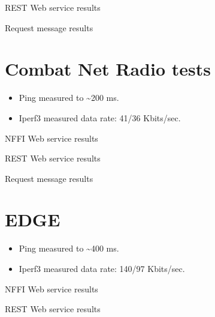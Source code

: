 \begin{appendices}
\begin{table}[H]

\caption{REST Web service results}
\end{table}


\begin{table}[H]

\caption{Request message results}
\end{table}

\section{Combat Net Radio tests}

\begin{itemize}
	\item Ping measured to \textasciitilde 200 ms.
	\item Iperf3 measured data rate: 41/36 Kbits/sec.
\end{itemize}

\begin{table}[H]

\caption{NFFI Web service results}
\end{table}


\begin{table}[H]

\caption{REST Web service results}
\end{table}


\begin{table}[H]

\caption{Request message results}
\end{table}

\section{EDGE}

\begin{itemize}
	\item Ping measured to \textasciitilde 400 ms.
	\item Iperf3 measured data rate: 140/97 Kbits/sec.
\end{itemize}

\begin{table}[H]

\caption{NFFI Web service results}
\end{table}


\begin{table}[H]

\caption{REST Web service results}
\end{table}


\end{appendices}
